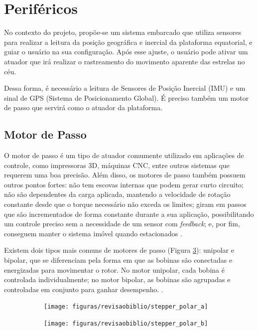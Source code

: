 \section{Periféricos}

No contexto do projeto, propõe-se um sistema embarcado que utiliza sensores para realizar a leitura da posição geográfica e inercial da plataforma equatorial, e guiar o usuário na sua configuração. Após esse ajuste, o usuário pode ativar um atuador que irá realizar o rastreamento do movimento aparente das estrelas no céu. 

Dessa forma, é necessário a leitura de Sensores de Posição Inercial (IMU) e um sinal de GPS (Sistema de Posicionamento Global). É preciso também um motor de passo que servirá como o atuador da plataforma.

\subsection{Motor de Passo}

O motor de passo é um tipo de atuador comumente utilizado em aplicações de controle, como impressoras 3D, máquinas CNC, entre outros sistemas que requerem uma boa precisão. Além disso, os motores de passo também possuem outros pontos fortes: não tem escovas internas que podem gerar curto circuito; não são dependentes da carga aplicada, mantendo a velocidade de rotação constante desde que o torque necessário não exceda os limites; giram em passos que são incrementados de forma constante durante a sua aplicação, possibilitando um controle preciso sem a necessidade de um sensor com \textit{feedback}; e, por fim, conseguem manter o sistema imóvel quando estacionados \cite{manual:stepperMicrochip}.

Existem dois tipos mais comuns de motores de passo (Figura \ref{fig:stepper_polar}): unipolar e bipolar, que se diferenciam pela forma em que as bobinas são conectadas e energizadas para movimentar o rotor. No motor unipolar, cada bobina é controlada individualmente; no motor bipolar, as bobinas são agrupadas e controladas em conjunto para ganhar desempenho. \cite{man:advancedmicrosystemStepControl}.

\begin{figure}[!htb]
	\centering
	\captionsetup[subfigure]{justification=centering}
	\caption{Modelos de motores: (a) um motor unipolar, (b) motor bipolar}
	\begin{subfigure}[b]{0.49\textwidth}
		\centering
		\texttt{[image: figuras/revisaobiblio/stepper\_polar\_a]}
		\caption{}
		\label{fig:stepper_polara}
	\end{subfigure}
	\hfill
	\begin{subfigure}[b]{0.49\textwidth}
		\centering
		\texttt{[image: figuras/revisaobiblio/stepper\_polar\_b]}
		\caption{}
		\label{fig:stepper_polarb}
	\end{subfigure}

\label{fig:stepper_polar}
\end{figure}

